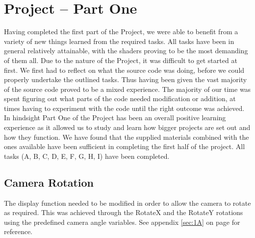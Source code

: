 \documentclass{article}
\begin{document}
\newpage

\section{Project -- Part One} %

\begin{question}
		
Having completed the first part of the Project, we were able to benefit from a variety of new things learned from the required tasks. All tasks have been in general relatively attainable, with the shaders proving to be the most demanding of them all.
\newline
\newline
Due to the nature of the Project, it was difficult to get started at first. We first had to reflect on what the source code was doing, before we could properly undertake the outlined tasks. Thus having been given the vast majority of the source code proved to be a mixed experience. The majority of our time was spent figuring out what parts of the code needed modification or addition, at times having to experiment with the code until the right outcome was achieved.
\newline
\newline
In hindsight Part One of the Project has been an overall positive learning experience as it allowed us to study and learn how bigger projects are set out and how they function. We have found that the supplied materials combined with the ones available have been sufficient in completing the first half of the project.
\newline
\newline
All tasks (A, B, C, D, E, F, G, H, I) have been completed.
\end{question}


\subsection{Camera Rotation}

The display function needed to be modified in order to allow the camera to rotate as required. This was achieved through the RotateX and the RotateY rotations using the predefined camera angle variables.
\newline
\newline
See appendix \ref{sec:1A} on page \pageref{sec:1A} for reference.
\end{document}
